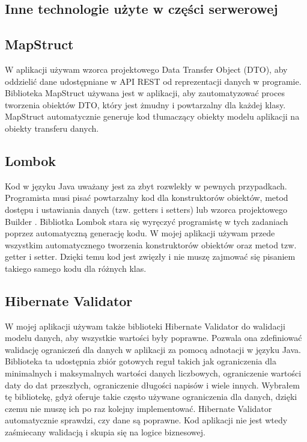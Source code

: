\documentclass[shortabstract,inz]{iithesis}
\begin{document}
\subsection{Inne technologie użyte w  części serwerowej}
\subsection*{MapStruct}
W aplikacji używam wzorca projektowego Data Transfer Object \citep{dto-pattern} (DTO), aby oddzielić dane udostępniane w API REST od reprezentacji danych w programie. Biblioteka MapStruct \citep{mapstruct} używana jest w aplikacji, aby zautomatyzować proces tworzenia obiektów DTO, który jest żmudny i powtarzalny dla każdej klasy. MapStruct automatycznie generuje kod tłumaczący obiekty modelu aplikacji na obiekty transferu danych.
\subsection*{Lombok}
Kod w języku Java uważany jest za zbyt rozwlekły w pewnych przypadkach. Programista musi pisać powtarzalny kod dla konstruktorów obiektów, metod dostępu i ustawiania danych (tzw. getters i setters) lub wzorca projektowego Builder \citep{builder-pattern}. Bibliotka Lombok stara się wyręczyć programistę w tych zadaniach poprzez automatyczną generację kodu. W mojej aplikacji używam przede wszystkim automatycznego tworzenia konstruktorów obiektów oraz metod tzw. getter i setter. Dzięki temu kod jest zwięzły i nie muszę zajmować się pisaniem takiego samego kodu dla różnych klas.
\subsection*{Hibernate Validator}
W mojej aplikacji używam także biblioteki Hibernate Validator \citep{hibernate-validator} do walidacji modelu danych, aby wszystkie wartości były poprawne. Pozwala ona zdefiniować walidację ograniczeń dla danych w aplikacji za pomocą adnotacji w języku Java. Biblioteka ta udostępnia zbiór gotowych reguł takich jak ograniczenia dla minimalnych i maksymalnych wartości danych liczbowych, ograniczenie wartości daty do dat przeszłych, ograniczenie długości napisów i wiele innych. Wybrałem tę bibliotekę, gdyż oferuje takie często używane ograniczenia dla danych, dzięki czemu nie muszę ich po raz kolejny implementować. Hibernate Validator automatycznie sprawdzi, czy dane są poprawne. Kod aplikacji nie jest wtedy zaśmiecany walidacją i skupia się na logice biznesowej.
\end{document}
